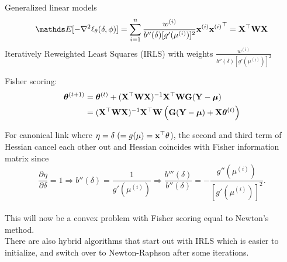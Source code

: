 \documentclass[11pt,compress,t,notes=noshow, xcolor=table]{beamer}
\begin{document}
\begin{vbframe}{Generalized linear models}
$$\E[-\nabla^2 \logl_{\theta}(\delta, \phi)] = \sumin \frac{w^{(i)}}{b''(\delta)[g'(\mu^{(i)})]^2}\xv^{(i)}{\xv^{(i)}}^\top = \mathbf{X}^\top \mathbf{W} \mathbf{X}$$
\lz
Iteratively Reweighted Least Squares (IRLS) with weights $\frac{w^{(i)}}{b''(\delta)[g'(\mu^{(i)})]^2}$\\

\framebreak

Fisher scoring:
\begin{align*}
\bm{\theta}^{(t+1)} &=\bm{\theta}^{(t)} + (\mathbf{X}^\top \mathbf{W} \mathbf{X})^{-1}\mathbf{X}^\top \mathbf{W} \mathbf{G} (\mathbf{Y}-\bm{\mu})\\
& =(\mathbf{X}^\top \mathbf{W} \mathbf{X})^{-1}\mathbf{X}^\top \mathbf{W} \left(\mathbf{G} (\mathbf{Y}-\bm{\mu})+\mathbf{X}\bm{\theta}^{(t)}\right)
\end{align*}

\lz

For canonical link where $\eta = \delta \;(= g(\mu) = \mathbf{x}^\top\theta$), the second and third term of Hessian cancel each other out and Hessian coincides with Fisher information matrix since$$\frac{\partial{\eta}}{\partial{\delta}} = 1 \Rightarrow b''(\delta) = \frac{1}{g'(\mu^{(i)})} \Rightarrow  \frac{b'''(\delta)}{b''(\delta)} = -   \frac{g''(\mu^{(i)})}{[g'(\mu^{(i)})]^2}.$$\\
This will now be a convex problem with Fisher scoring equal to Newton's method.\\
\lz
There are also hybrid algorithms that start out with IRLS which is easier to initialize, and switch over to Newton-Raphson after some iterations.

\end{vbframe}


\endlecture
\end{document}
